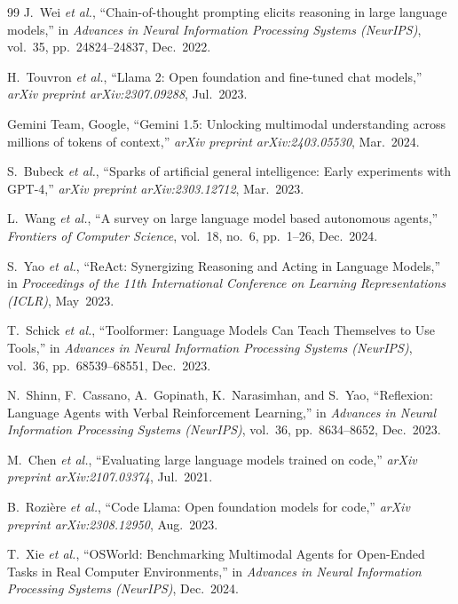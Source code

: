\documentclass[12pt,letterpaper,oneside]{report}
\begin{document}
\begin{thebibliography}{99}
J.~Wei \textit{et al.},
``Chain-of-thought prompting elicits reasoning in large language models,''
in \textit{Advances in Neural Information Processing Systems (NeurIPS)},
vol.~35, pp.~24824--24837, Dec.~2022.

H.~Touvron \textit{et al.},
``Llama 2: Open foundation and fine-tuned chat models,''
\textit{arXiv preprint arXiv:2307.09288}, Jul.~2023.

Gemini Team, Google,
``Gemini 1.5: Unlocking multimodal understanding across millions of tokens of context,''
\textit{arXiv preprint arXiv:2403.05530}, Mar.~2024.

S.~Bubeck \textit{et al.},
``Sparks of artificial general intelligence: Early experiments with GPT-4,''
\textit{arXiv preprint arXiv:2303.12712}, Mar.~2023.

L.~Wang \textit{et al.},
``A survey on large language model based autonomous agents,''
\textit{Frontiers of Computer Science},
vol.~18, no.~6, pp.~1--26, Dec.~2024.

S.~Yao \textit{et al.},
``ReAct: Synergizing Reasoning and Acting in Language Models,''
in \textit{Proceedings of the 11th International Conference on Learning Representations (ICLR)},
May~2023.

T.~Schick \textit{et al.},
``Toolformer: Language Models Can Teach Themselves to Use Tools,''
in \textit{Advances in Neural Information Processing Systems (NeurIPS)},
vol.~36, pp.~68539--68551, Dec.~2023.

N.~Shinn, F.~Cassano, A.~Gopinath, K.~Narasimhan, and S.~Yao,
``Reflexion: Language Agents with Verbal Reinforcement Learning,''
in \textit{Advances in Neural Information Processing Systems (NeurIPS)},
vol.~36, pp.~8634--8652, Dec.~2023.

M.~Chen \textit{et al.},
``Evaluating large language models trained on code,''
\textit{arXiv preprint arXiv:2107.03374}, Jul.~2021.

B.~Rozi{\`e}re \textit{et al.},
``Code Llama: Open foundation models for code,''
\textit{arXiv preprint arXiv:2308.12950}, Aug.~2023.

T.~Xie \textit{et al.},
``OSWorld: Benchmarking Multimodal Agents for Open-Ended Tasks in Real Computer Environments,''
in \textit{Advances in Neural Information Processing Systems (NeurIPS)},
Dec.~2024.


\end{thebibliography}
\end{document}
